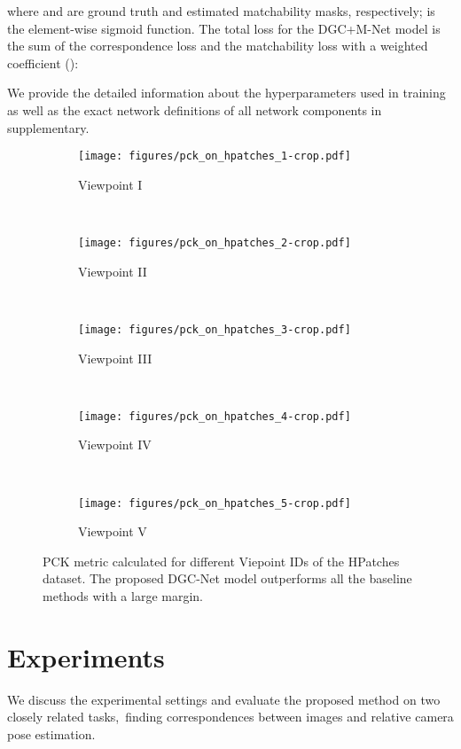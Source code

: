 \documentclass[10pt,twocolumn,letterpaper]{article}
\begin{document}
\noindent where  and  are ground truth and  estimated matchability masks, respectively;  is the element-wise sigmoid function. The total loss for the DGC+M-Net model is the sum of the correspondence loss  and the matchability loss  with a weighted coefficient  ():


We provide the detailed information about the hyperparameters used in training as well as the exact network definitions of all network components in supplementary.

\begin{figure*}[t!]
 	\centering
 	\begin{subfigure}[t]{.2\textwidth}
 		\centering
\texttt{[image: figures/pck\_on\_hpatches\_1-crop.pdf]}
 		\caption{Viewpoint I}
 	\end{subfigure}~
 	\begin{subfigure}[t]{.2\textwidth}
 		\centering
 		\texttt{[image: figures/pck\_on\_hpatches\_2-crop.pdf]}
 		\caption{Viewpoint II}
 	\end{subfigure}~
 	\begin{subfigure}[t]{.2\textwidth}
 		\centering
 		\texttt{[image: figures/pck\_on\_hpatches\_3-crop.pdf]}
 		\caption{Viewpoint III}
 	\end{subfigure}~
 	\begin{subfigure}[t]{.2\textwidth}
 		\centering
 		\texttt{[image: figures/pck\_on\_hpatches\_4-crop.pdf]}
 		\caption{Viewpoint IV}
 	\end{subfigure}~
 	\begin{subfigure}[t]{.2\textwidth}
 		\centering
 		\texttt{[image: figures/pck\_on\_hpatches\_5-crop.pdf]}
 		\caption{Viewpoint V}\end{subfigure}
\caption{PCK metric calculated for different Viepoint IDs of the HPatches dataset. The proposed DGC-Net model outperforms all the baseline methods with a large margin.}\label{fig:pck_hpatches}
\vspace{-2mm}
\end{figure*}

\vspace{-2mm}
\section{Experiments}
\vspace{-1mm}
We discuss the experimental settings and evaluate the proposed method on two closely related tasks,~\ie finding correspondences between images and relative camera pose estimation. 
\end{document}
